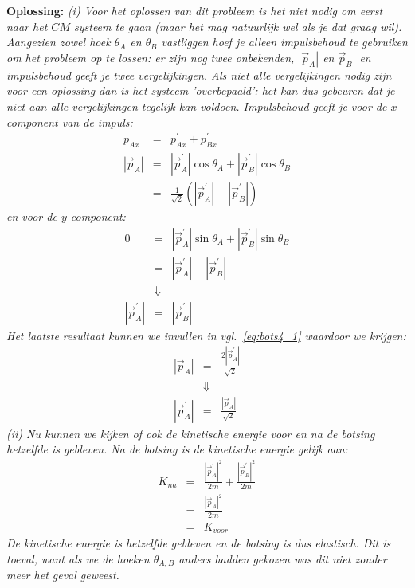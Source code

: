 \begin{voorbeeld}
{\bf Oplossing: }{\it (i) Voor het oplossen van dit probleem is het niet nodig om eerst naar het $CM$ systeem
te gaan (maar het mag natuurlijk wel als je dat graag wil). Aangezien zowel hoek $\theta_A$ en $\theta_B$ vastliggen
hoef je alleen impulsbehoud te gebruiken om het probleem op te lossen: er zijn nog twee onbekenden, $|\vec{p}_A|$ en
$\vec{p}_B|$ en impulsbehoud geeft je twee vergelijkingen. Als niet alle vergelijkingen nodig zijn voor een 
oplossing dan is het systeem 'overbepaald': het kan dus gebeuren dat je niet aan alle vergelijkingen tegelijk kan 
voldoen. Impulsbehoud geeft je voor de $x$ component van de impuls:
\begin{eqnarray}
p_{Ax} & = & p_{Ax}^{\prime} + p_{Bx}^{\prime} \\
|\vec{p}_A| & = & |\vec{p}_A^{\prime}|\cos\theta_A +  |\vec{p}_B^{\prime}|\cos\theta_B \\
 & = & \frac{1}{\sqrt{2}}\left( |\vec{p}_A^{\prime}|+|\vec{p}_B^{\prime}|\right)\label{eq:bots4_1}
\end{eqnarray}
en voor de $y$ component:
\begin{eqnarray}
0 & = &  |\vec{p}_A^{\prime}|\sin\theta_A +  |\vec{p}_B^{\prime}|\sin\theta_B \\
   & = & |\vec{p}_A^{\prime}| -  |\vec{p}_B^{\prime}| \\
   & \Downarrow & \\
  |\vec{p}_A^{\prime}| & = & |\vec{p}_B^{\prime}|
\end{eqnarray}
Het laatste resultaat kunnen we invullen in vgl.~\ref{eq:bots4_1} waardoor we krijgen:
\begin{eqnarray}
|\vec{p}_A| & = & \frac{2 |\vec{p}_A^{\prime}|}{\sqrt{2}}\\
& \Downarrow & \\
|\vec{p}_A^{\prime}| & =  & \frac{|\vec{p}_A|}{\sqrt{2}}
\end{eqnarray}
(ii) Nu kunnen we kijken of ook de kinetische energie voor en na de botsing hetzelfde is gebleven.
Na de botsing is de kinetische energie gelijk aan:
\begin{eqnarray}
K_{na} & = &  \frac{|\vec{p}_A^{\prime}|^2}{2m} + \frac{|\vec{p}_B^{\prime}|^2}{2m} \\
& = & \frac{|\vec{p}_A|^2}{2m} \\
& = & K_{voor}
\end{eqnarray}
De kinetische energie is hetzelfde gebleven en de botsing is dus elastisch. Dit is toeval, want als
we de hoeken $\theta_{A,B}$ anders hadden gekozen was dit niet zonder meer het geval geweest.
}
\end{voorbeeld}

